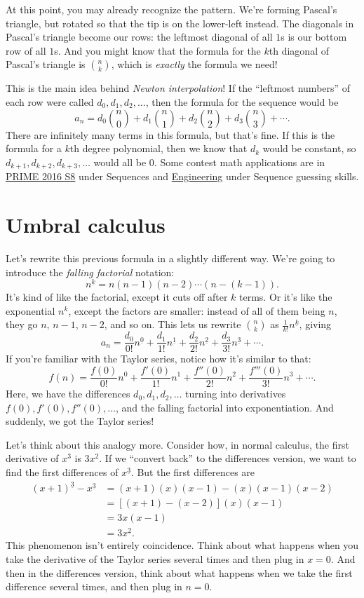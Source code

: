 \documentclass[11pt,paper=letter]{scrartcl}
\newcommand{\ff}[1]{^{\underline{#1}}}
\begin{document}
At this point, you may already recognize the pattern. We're forming Pascal's triangle, but rotated so that the tip is on the lower-left instead. The diagonals in Pascal's triangle become our rows: the leftmost diagonal of all $1$s is our bottom row of all $1$s. And you might know that the formula for the $k$th diagonal of Pascal's triangle is $\binom{n}{k}$, which is \textit{exactly} the formula we need!

This is the main idea behind \textit{Newton interpolation}! If the ``leftmost numbers'' of each row were called $d_0, d_1, d_2, \ldots$, then the formula for the sequence would be
\[
  a_n = d_0 \binom{n}{0} + d_1 \binom{n}{1} + d_2 \binom{n}{2} + d_3 \binom{n}{3} + \cdots.
\]
There are infinitely many terms in this formula, but that's fine. If this is the formula for a $k$th degree polynomial, then we know that $d_k$ would be constant, so $d_{k+1}, d_{k+2}, d_{k+3}, \ldots$ would all be $0$. Some contest math applications are in \href{https://cjquines.com/files/prime2016/prime8.pdf}{PRIME 2016 S8} under Sequences and \href{https://cjquines.com/files/engineering.pdf}{Engineering} under Sequence guessing skills.

\section{Umbral calculus}

Let's rewrite this previous formula in a slightly different way. We're going to introduce the \textit{falling factorial} notation:
\[
  n\ff{k} = n(n-1)(n-2)\cdots\left(n-(k-1)\right).
\]
It's kind of like the factorial, except it cuts off after $k$ terms. Or it's like the exponential $n^k$, except the factors are smaller: instead of all of them being $n$, they go $n$, $n-1$, $n-2$, and so on. This lets us rewrite $\binom{n}{k}$ as $\frac{1}{k!} n\ff{k}$, giving
\[
  a_n = \frac{d_0}{0!} n\ff{0} + \frac{d_1}{1!} n\ff{1} + \frac{d_2}{2!} n\ff{2} + \frac{d_3}{3!} n\ff{3} + \cdots.
\]
If you're familiar with the Taylor series, notice how it's similar to that:
\[
  f(n) = \frac{f(0)}{0!} n^0 + \frac{f'(0)}{1!} n^1 + \frac{f''(0)}{2!} n^2 + \frac{f'''(0)}{3!} n^3 + \cdots.
\]
Here, we have the differences $d_0, d_1, d_2, \ldots$ turning into derivatives $f(0), f'(0), f''(0), \ldots$, and the falling factorial into exponentiation. And suddenly, we got the Taylor series!

Let's think about this analogy more. Consider how, in normal calculus, the first derivative of $x^3$ is $3x^2$. If we ``convert back'' to the differences version, we want to find the first differences of $x\ff{3}$. But the first differences are
\begin{align*}
(x+1)\ff{3} - x\ff{3} &= (x+1)(x)(x-1) - (x)(x-1)(x-2) \\
&= \left[(x+1) - (x-2)\right](x)(x-1) \\
&= 3x(x-1) \\
&= 3x\ff{2}.
\end{align*}
This phenomenon isn't entirely coincidence. Think about what happens when you take the derivative of the Taylor series several times and then plug in $x = 0$. And then in the differences version, think about what happens when we take the first difference several times, and then plug in $n = 0$.
\end{document}
